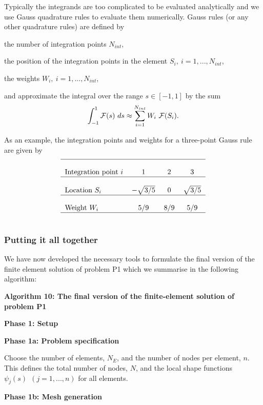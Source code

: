 Typically the integrands are too complicated to be evaluated analytically and we use Gauss quadrature rules to evaluate them numerically. Gauss rules (or any other quadrature rules) are defined by
\begin{DoxyItemize}
\item the number of integration points $N_{int} $,
\item the position of the integration points in the element $S_{i}, \ i=1,...,N_{int} $,
\item the weights $W_{i}, \ i=1,...,N_{int} $,
\end{DoxyItemize}

and approximate the integral over the range $ s\in [-1,1]$ by the sum \[ \int_{-1}^1 {\cal F}(s)\ ds \approx \sum_{i=1}^{N_{int}} W_i \ {\cal F}(S_i). \]

As an example, the integration points and weights for a three-\/point Gauss rule are given by \[ \mbox{ \begin{tabular}{l c c c} \hline \\ \mbox{Integration point $i$} & 1 & 2 & 3 \\ \hline \\ \mbox{Location $S_i$} & $-\sqrt{3/5}$ & $ 0$ & $\sqrt{3/5}$ \\ \hline \\ \mbox{Weight $W_i$} & 5/9 & 8/9 & 5/9 \\ \hline \\ \end{tabular} } \]



\hypertarget{index_altogether}{}\subsubsection{Putting it all together}\label{index_altogether}
We have now developed the necessary tools to formulate the final version of the finite element solution of problem P1 which we summarise in the following algorithm\-:

\begin{center} {\bfseries  Algorithm 10\-: The final version of the finite-\/element solution of problem P1 } \end{center}  {\bfseries  Phase 1\-: Setup}

{\bfseries  Phase 1a\-: Problem specification}


\begin{DoxyItemize}
\item Choose the number of elements, $ N_E $, and the number of nodes per element, $ n$. This defines the total number of nodes, $N$, and the local shape functions $ \psi_j(s) \ \ (j=1,...,n)$ for all elements.

{\bfseries  Phase 1b\-: Mesh generation}
\end{DoxyItemize}


